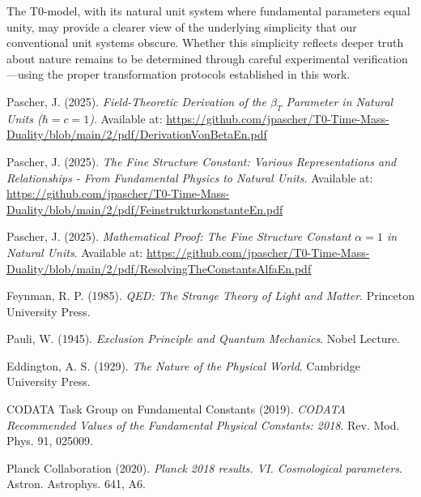\documentclass[12pt,a4paper]{article}
\begin{document}
	The T0-model, with its natural unit system where fundamental parameters equal unity, may provide a clearer view of the underlying simplicity that our conventional unit systems obscure. Whether this simplicity reflects deeper truth about nature remains to be determined through careful experimental verification---using the proper transformation protocols established in this work.
	
	\begin{thebibliography}{9}
		Pascher, J. (2025). \textit{Field-Theoretic Derivation of the $\beta_T$ Parameter in Natural Units ($\hbar = c = 1$)}. Available at: \url{https://github.com/jpascher/T0-Time-Mass-Duality/blob/main/2/pdf/DerivationVonBetaEn.pdf}
		
		Pascher, J. (2025). \textit{The Fine Structure Constant: Various Representations and Relationships - From Fundamental Physics to Natural Units}. Available at: \url{https://github.com/jpascher/T0-Time-Mass-Duality/blob/main/2/pdf/FeinstrukturkonstanteEn.pdf}
		
		Pascher, J. (2025). \textit{Mathematical Proof: The Fine Structure Constant $\alpha = 1$ in Natural Units}. Available at: \url{https://github.com/jpascher/T0-Time-Mass-Duality/blob/main/2/pdf/ResolvingTheConstantsAlfaEn.pdf}
		
		
		
		Feynman, R. P. (1985). \textit{QED: The Strange Theory of Light and Matter}. Princeton University Press.
		
		Pauli, W. (1945). \textit{Exclusion Principle and Quantum Mechanics}. Nobel Lecture.
		
		Eddington, A. S. (1929). \textit{The Nature of the Physical World}. Cambridge University Press.
		
		CODATA Task Group on Fundamental Constants (2019). \textit{CODATA Recommended Values of the Fundamental Physical Constants: 2018}. Rev. Mod. Phys. 91, 025009.
		
		Planck Collaboration (2020). \textit{Planck 2018 results. VI. Cosmological parameters}. Astron. Astrophys. 641, A6.
	\end{thebibliography}
	
\end{document}
